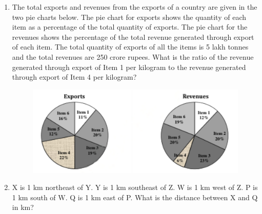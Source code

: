 \documentclass[journal,12pt,onecolumn]{IEEEtran}
\theoremstyle{remark}
\begin{document}
\begin{enumerate}
    \item The total exports and revenues from the exports of a country are given in the two pie charts below. The pie chart for exports shows the quantity of each item as a percentage of the total quantity of exports. The pie chart for the revenues shows the percentage of the total revenue generated through export of each item. The total quantity of exports of all the items is 5 lakh tonnes and the total revenues are 250 crore rupees. What is the ratio of the revenue generated through export of Item 1 per kilogram to the revenue generated through export of Item 4 per kilogram?

    \hfill{}
    \begin{figure}[H]
        \centering
        \includegraphics[width=0.8\columnwidth]{q8}
        \caption*{}
        \label{Q8}
    \end{figure}
        \begin{enumerate}
        \end{enumerate}

    \item X is 1 km northeast of Y. Y is 1 km southeast of Z. W is 1 km west of Z. P is 1 km south of W. Q is 1 km east of P. What is the distance between X and Q in km?

    \hfill{}
        \begin{enumerate}
        \end{enumerate}
    

\end{enumerate}
\end{document}

